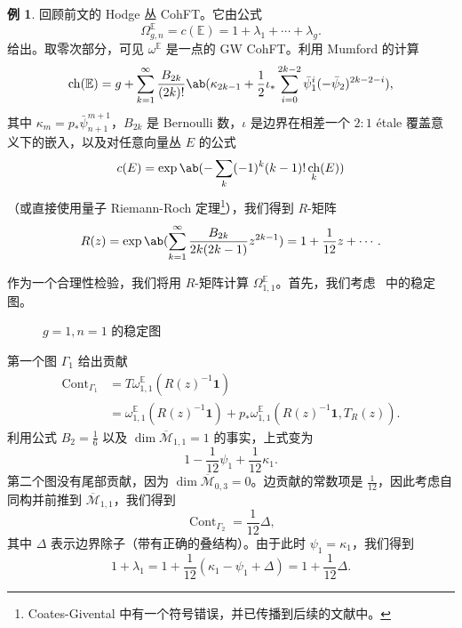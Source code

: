\documentclass{amsart}
\theoremstyle{definition}
\newtheorem{exm}[thm]{例}
\theoremstyle{remark}
\theoremstyle{plain}
\theoremstyle{definition}
\theoremstyle{remark}
\newcommand{\E}{\mathbb{E}}
\newcommand{\Mbar}{\overline{\mathcal{M}}}
\newcommand{\1}{\mathbf{1}}
\newcommand{\2}{\mathbf{2}}
\newcommand{\3}{\mathbf{3}}
\DeclareMathOperator{\ch}{ch}
\DeclareMathOperator{\Cont}{Cont}
\begin{document}
\begin{exm}
    回顾前文的 Hodge 丛 CohFT。它由公式
    \[ \Omega^{\E}_{g,n} = c(\E) = 1 + \lambda_1 + \cdots + \lambda_g. \]
    给出。取零次部分，可见 $\omega^{\E}$ 是一点的 GW CohFT。利用 Mumford 的计算
    \[ \ch(\E) = g + \sum_{k=1}^{\infty} \frac{B_{2k}}{(2k)!}\ab(\kappa_{2k-1} + \frac{1}{2}\iota_*\sum_{i=0}^{2k-2} \bar{\psi}_1^{i} (-\bar{\psi}_2)^{2k-2-i}), \]
    其中 $\kappa_{m} = p_* \bar{\psi}_{n+1}^{m+1}$，$B_{2k}$ 是 Bernoulli 数，$\iota$ 是边界在相差一个 $2:1$ \'etale 覆盖意义下的嵌入，以及对任意向量丛 $E$ 的公式
    \[ c(E) = \exp \ab(-\sum_k (-1)^k (k-1)!\ch_k(E)) \]
    （或直接使用量子 Riemann-Roch 定理\footnote{Coates-Givental 中有一个符号错误，并已传播到后续的文献中。}），我们得到 $R$-矩阵
    \[ R(z) = \exp\ab( \sum_{k=1}^{\infty} \frac{B_{2k}}{2k(2k-1)} z^{2k-1}) = 1+\frac{1}{12}z + \cdots. \]

    作为一个合理性检验，我们将用 $R$-矩阵计算 $\Omega_{1,1}^{\E}$。首先，我们考虑~ 中的稳定图。
    \begin{figure}[htpb]
    \begin{center}
    \end{center}
    \caption{$g=1, n=1$ 的稳定图}%
    \label{fig:03graphloop}
    \end{figure}
    第一个图 $\Gamma_1$ 给出贡献
    \begin{align*}
        \Cont_{\Gamma_1} &= T\omega_{1,1}^{\E}(R(z)^{-1}\1) \\
        &= \omega_{1,1}^{\E}(R(z)^{-1}\1) + p_* \omega_{1,1}^{\E}(R(z)^{-1}\1, T_R(z)).
    \end{align*}
    利用公式 $B_2 = \frac{1}{6}$ 以及 $\dim \Mbar_{1,1} = 1$ 的事实，上式变为
    \[ 1 - \frac{1}{12}\psi_1 + \frac{1}{12} \kappa_1. \]
    第二个图没有尾部贡献，因为 $\dim \Mbar_{0,3} = 0$。边贡献的常数项是 $\frac{1}{12}$，因此考虑自同构并前推到 $\Mbar_{1,1}$，我们得到
    \[ \Cont_{\Gamma_2} = \frac{1}{12} \Delta, \]
    其中 $\Delta$ 表示边界除子（带有正确的叠结构）。由于此时 $\psi_1 = \kappa_1$，我们得到
    \[ 1+\lambda_1 = 1 + \frac{1}{12}(\kappa_1 - \psi_1 + \Delta) = 1 + \frac{1}{12} \Delta. \]
\end{exm}
\end{document}
